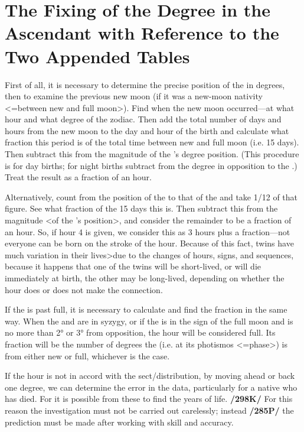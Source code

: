 \section{The Fixing of the Degree in the Ascendant with Reference to the Two Appended Tables}

First of all, it is necessary to determine the precise position of the \Sun\xspace in degrees, then to examine the previous new moon (if it was a new-moon nativity <=between new and full moon>). Find when the new moon occurred—at what hour and what degree of the zodiac. Then add the total number of days and hours from the new moon to the day and hour of the birth and calculate what fraction this period is of the total time between new and full moon (i.e. 15 days). Then subtract this from the magnitude of the \Sun’s degree position. (This procedure is for day births; for night births subtract from the degree in opposition to the \Sun.) Treat the result as a fraction of an hour.

Alternatively, count from the position of the \Sun\xspace to that of the \Moon\xspace and take 1/12 of that figure. See what fraction of the 15 days this is. Then subtract this from the magnitude <of the \Sun’s position>, and consider the remainder to be a fraction of an hour. So, if hour 4 is given, we consider this as 3 hours plus a fraction—not everyone can be born on the stroke of the hour. Because of this fact, twins have much variation in their lives>due to the changes of hours, signs, and sequences, because it happens that one of the twins will be short-lived, or will die immediately at birth, the other may be long-lived, depending on whether the hour does or does not make the connection.

If the \Moon\xspace is past full, it is necessary to calculate and find the fraction in the same way. When the \Sun\xspace and \Moon\xspace are in syzygy, or if the \Moon\xspace is in the sign of the full moon and is no more than 2° or 3° from opposition, the hour will be considered full. Its fraction will be the number of degrees the \Moon\xspace (i.e.
at its photismos <=phase>) is from either new or full, whichever is the case. 

If the hour is not in accord with the sect/distribution, by moving ahead or back one degree, we can determine the error in the data, particularly for a native who has died. For it is possible from these to find the years of life. \textbf{/298K/} For this reason the investigation must not be carried out carelessly; instead \textbf{/285P/} the prediction must be made after working with skill and accuracy. 

